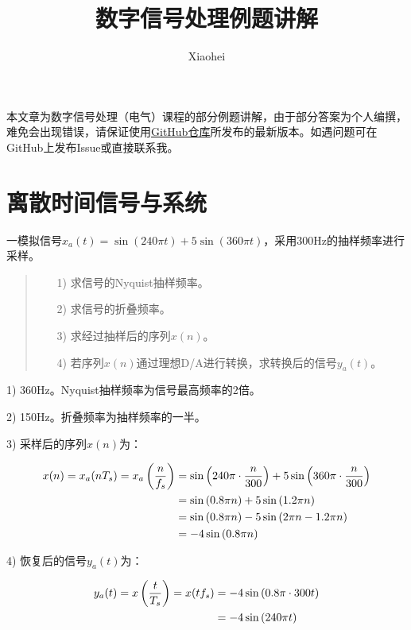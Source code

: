 \documentclass[cn, hazy, blue, normal, 12pt]{elegantnote}
\title{数字信号处理例题讲解}
\author{Xiaohei}
\date{\zhtoday}
\begin{document}
\maketitle

\setlength{\lineskip}{1.5em}
\setlength{\parskip}{0}


本文章为数字信号处理（电气）课程的部分例题讲解，由于部分答案为个人编撰，难免会出现错误，请保证使用\href{https://github.com/Moby-C/DigitalSignalProcessingNote}{GitHub仓库}所发布的最新版本。如遇问题可在GitHub上发布Issue或直接联系我。


\section{离散时间信号与系统}


\begin{exercise}

一模拟信号$x_a(t)=\sin(240\pi t)+5\sin(360\pi t)$，采用300Hz的抽样频率进行采样。

\begin{quote}
\begin{itemize}
    \item[1)] 求信号的Nyquist抽样频率。
    \item[2)] 求信号的折叠频率。
    \item[3)] 求经过抽样后的序列$x(n)$。
    \item[4)] 若序列$x(n)$通过理想D/A进行转换，求转换后的信号$y_a(t)$。
\end{itemize}
\end{quote}

\end{exercise}

\begin{solution}[print=true]

1) 360Hz。Nyquist抽样频率为信号最高频率的2倍。

2) 150Hz。折叠频率为抽样频率的一半。

3) 采样后的序列$x(n)$为：

\begin{equation}
\notag
\begin{aligned}
    x(n)=x_a(nT_s)=x_a\left(\frac{n}{f_s}\right)&=\sin\left(240\pi\cdot\frac{n}{300}\right)+5\sin\left(360\pi\cdot\frac{n}{300}\right) \\
    &=\sin\left(0.8\pi n\right)+5\sin\left(1.2\pi n\right) \\
    &=\sin\left(0.8\pi n\right)-5\sin\left(2\pi n-1.2\pi n\right) \\
    &=-4\sin\left(0.8\pi n\right)
\end{aligned}
\end{equation}

4) 恢复后的信号$y_a(t)$为：

\begin{equation}
\notag
\begin{aligned}
    y_a(t)=x\left(\frac{t}{T_s}\right)=x(tf_s)&=-4\sin\left(0.8\pi \cdot 300 t\right) \\
    &=-4\sin\left(240\pi t\right)
\end{aligned}
\end{equation}

\end{solution}
\end{document}
